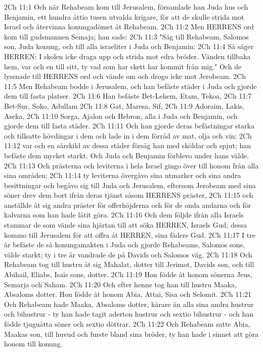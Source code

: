 2Ch 11:1  Och när Rehabeam kom till Jerusalem, församlade han Juda hus och Benjamin, ett hundra åttio tusen utvalda krigare, för att de skulle strida mot Israel och återvinna konungadömet åt Rehabeam.
2Ch 11:2  Men HERRENS ord kom till gudsmannen Semaja; han sade:
2Ch 11:3  "Säg till Rehabeam, Salomos son, Juda konung, och till alla israeliter i Juda och Benjamin:
2Ch 11:4  Så säger HERREN: I skolen icke draga upp och strida mot edra bröder. Vänden tillbaka hem, var och en till sitt, ty vad som har skett har kommit från mig." Och de lyssnade till HERRENS ord och vände om och drogo icke mot Jerobeam.
2Ch 11:5  Men Rehabeam bodde i Jerusalem, och han befäste städer i Juda och gjorde dem till fasta platser.
2Ch 11:6  Han befäste Bet-Lehem, Etam, Tekoa,
2Ch 11:7  Bet-Sur, Soko, Adullam
2Ch 11:8  Gat, Maresa, Sif,
2Ch 11:9  Adoraim, Lakis, Aseka,
2Ch 11:10  Sorga, Ajalon och Hebron, alla i Juda och Benjamin, och gjorde dem till fasta städer.
2Ch 11:11  Och han gjorde deras befästningar starka och tillsatte hövdingar i dem och lade in i dem förråd av mat, olja och vin;
2Ch 11:12  var och en särskild av dessa städer försåg han med sköldar och spjut; han befäste dem mycket starkt. Och Juda och Benjamin förblevo under hans välde.
2Ch 11:13  Och prästerna och leviterna i hela Israel gingo över till honom från alla sina områden;
2Ch 11:14  ty leviterna övergåvo sina utmarker och sina andra besittningar och begåvo sig till Juda och Jerusalem, eftersom Jerobeam med sina söner drev dem bort ifrån deras tjänst såsom HERRENS präster,
2Ch 11:15  och anställde åt sig andra präster för offerhöjderna och för de onda andarna och för kalvarna som han hade låtit göra.
2Ch 11:16  Och dem följde ifrån alla Israels stammar de som vände sina hjärtan till att söka HERREN, Israels Gud; dessa kommo till Jerusalem för att offra åt HERREN, sina fäders Gud.
2Ch 11:17  I tre år befäste de så konungamakten i Juda och gjorde Rehabeams, Salomos sons, välde starkt; ty i tre år vandrade de på Davids och Salomos väg.
2Ch 11:18  Och Rehabeam tog till hustru åt sig Mahalat, dotter till Jerimot, Davids son, och till Abihail, Eliabs, Isais sons, dotter.
2Ch 11:19  Hon födde åt honom sönerna Jeus, Semarja och Saham.
2Ch 11:20  Och efter henne tog han till hustru Maaka, Absaloms dotter. Hon födde åt honom Abia, Attai, Sisa och Selomit.
2Ch 11:21  Och Rehabeam hade Maaka, Absaloms dotter, kärare än alla sina andra hustrur och bihustrur - ty han hade tagit aderton hustrur och sextio bihustrur - och han födde tjuguåtta söner och sextio döttrar.
2Ch 11:22  Och Rehabeam satte Abia, Maakas son, till huvud och furste bland sina bröder, ty han hade i sinnet att göra honom till konung.
